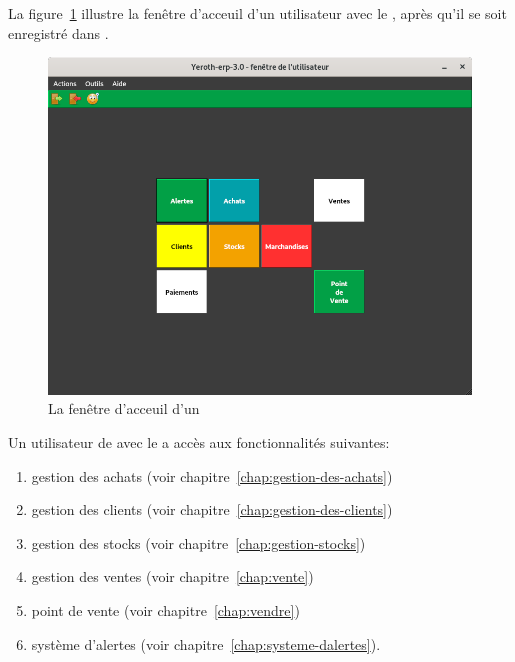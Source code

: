 \label{sec:utilisateurs-vendeur}

La figure~\ref{fig:yeren-fenetre-vendeur} illustre la fen\^etre
d'acceuil d'un utilisateur avec le \role \vendeur, 
apr\`es qu'il se soit enregistr\'e dans \yeroth.\\

\begin{figure}[!htbp]
\centering
\includegraphics[scale=0.63]{images/yeroth-fenetre-vendeur.png}
\caption{La fen\^etre d'acceuil d'un \vendeur}
\label{fig:yeren-fenetre-vendeur}
\end{figure}

Un utilisateur de \yeroth avec le \role \vendeur a acc\`es
aux fonctionnalit\'es suivantes:

\begin{enumerate}[1)]
	\item gestion des achats (voir chapitre~\ref{chap:gestion-des-achats})
	\item gestion des clients (voir chapitre~\ref{chap:gestion-des-clients})
	\item gestion des stocks (voir chapitre~\ref{chap:gestion-stocks})
	\item gestion des ventes (voir chapitre~\ref{chap:vente})
	\item point de vente (voir chapitre~\ref{chap:vendre})		
	\item syst\`eme d'alertes (voir chapitre~\ref{chap:systeme-dalertes}).\\	
\end{enumerate}
